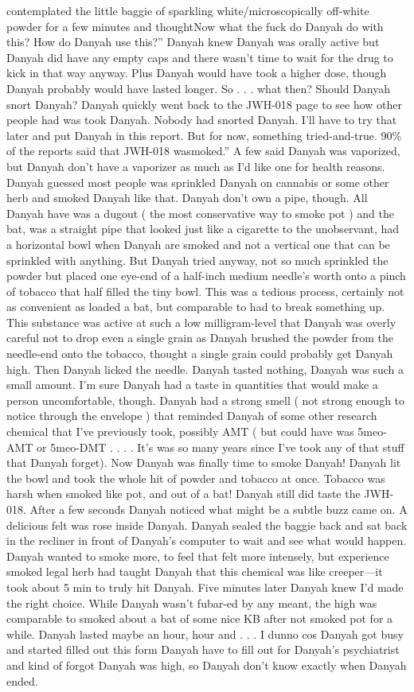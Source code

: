 \documentclass[12pt]{book}
\begin{document}
contemplated the little baggie of sparkling white/microscopically off-white powder for a few minutes and thoughtNow what the fuck do Danyah do with this? How do Danyah use this?'' Danyah knew Danyah was orally active but Danyah did have any empty caps and there wasn't time to wait for the drug to kick in that way anyway. Plus Danyah would have took a higher dose, though Danyah probably would have lasted longer. So . . . what then? Should Danyah snort Danyah? Danyah quickly went back to the JWH-018 page to see how other people had was took Danyah. Nobody had snorted Danyah. I'll have to try that later and put Danyah in this report. But for now, something tried-and-true. 90\% of the reports said that JWH-018 wasmoked.'' A few said Danyah was vaporized, but Danyah don't have a vaporizer as much as I'd like one for health reasons. Danyah guessed most people was sprinkled Danyah on cannabis or some other herb and smoked Danyah like that. Danyah don't own a pipe, though. All Danyah have was a dugout ( the most conservative way to smoke pot ) and the bat, was a straight pipe that looked just like a cigarette to the unobservant, had a horizontal bowl when Danyah are smoked and not a vertical one that can be sprinkled with anything. But Danyah tried anyway, not so much sprinkled the powder but placed one eye-end of a half-inch medium needle's worth onto a pinch of tobacco that half filled the tiny bowl. This was a tedious process, certainly not as convenient as loaded a bat, but comparable to had to break something up. This substance was active at such a low milligram-level that Danyah was overly careful not to drop even a single grain as Danyah brushed the powder from the needle-end onto the tobacco, thought a single grain could probably get Danyah high. Then Danyah licked the needle. Danyah tasted nothing, Danyah was such a small amount. I'm sure Danyah had a taste in quantities that would make a person uncomfortable, though. Danyah had a strong smell ( not strong enough to notice through the envelope ) that reminded Danyah of some other research chemical that I've previously took, possibly AMT ( but could have was 5meo-AMT or 5meo-DMT . . . . It's was so many years since I've took any of that stuff that Danyah forget). Now Danyah was finally time to smoke Danyah! Danyah lit the bowl and took the whole hit of powder and tobacco at once. Tobacco was harsh when smoked like pot, and out of a bat! Danyah still did taste the JWH-018. After a few seconds Danyah noticed what might be a subtle buzz came on. A delicious felt was rose inside Danyah. Danyah sealed the baggie back and sat back in the recliner in front of Danyah's computer to wait and see what would happen. Danyah wanted to smoke more, to feel that felt more intensely, but experience smoked legal herb had taught Danyah that this chemical was like creeper---it took about 5 min to truly hit Danyah. Five minutes later Danyah knew I'd made the right choice. While Danyah wasn't fubar-ed by any meant, the high was comparable to smoked about a bat of some nice KB after not smoked pot for a while. Danyah lasted maybe an hour, hour and  . . . I dunno cos Danyah got busy and started filled out this form Danyah have to fill out for Danyah's psychiatrist and kind of forgot Danyah was high, so Danyah don't know exactly when Danyah ended. 
\end{document}

